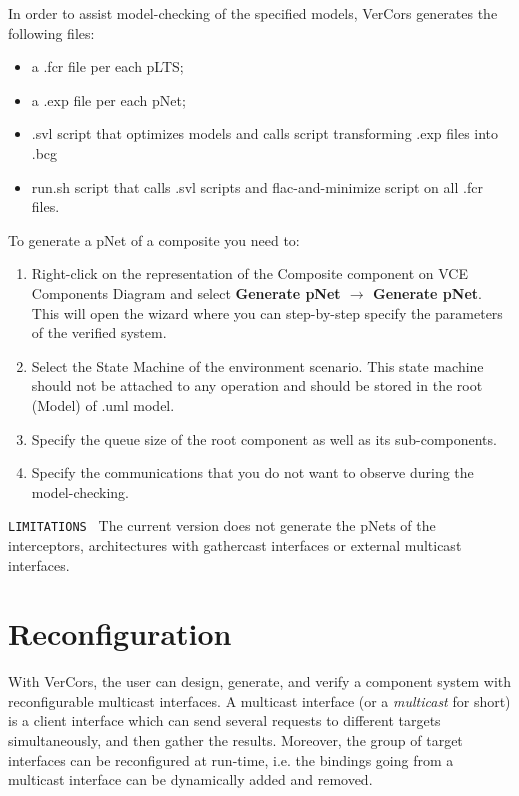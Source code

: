 \documentclass[12pt]{article}
\begin{document}
In order to assist model-checking of the specified models, VerCors generates the following files:
\begin{itemize}
\item
a .fcr file per each pLTS;
\item
a .exp file per each pNet;
\item
.svl script that optimizes models and calls script transforming .exp files into .bcg
\item
run.sh script that calls .svl scripts and flac-and-minimize script on all .fcr files.
\end{itemize}


To generate a pNet of a composite you need to:
\begin{enumerate}
\item
Right-click on the representation of the Composite component on VCE Components Diagram and select \textbf{Generate pNet $\rightarrow$ Generate pNet}. This will open the wizard where you can step-by-step specify the parameters of the verified system.
\item
Select the State Machine of the environment scenario. This state machine should not be attached to any operation and should be stored in the root (Model) of .uml model.
\item
Specify the queue size of the root component as well as its sub-components.
\item
Specify the communications that you do not want to observe during the model-checking.
\end{enumerate}

\texttt{LIMITATIONS } The current version does not generate the pNets of the interceptors, architectures with gathercast interfaces or external multicast interfaces.

\section{Reconfiguration}

With VerCors, the user can design, generate, and verify a component system with reconfigurable multicast interfaces.
A multicast interface (or a \textit{multicast} for short) is a client interface which can send several requests to different targets simultaneously, and then gather the results. Moreover, the group of target interfaces can be reconfigured at run-time, i.e. the bindings going from a multicast interface can be dynamically added and removed. 
\end{document}
